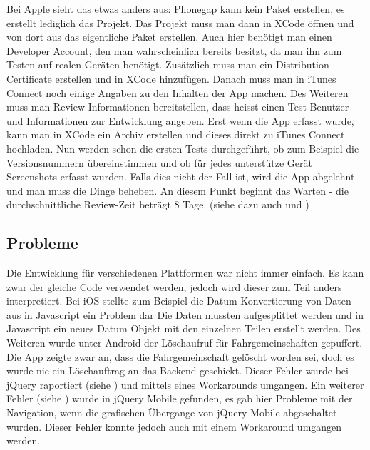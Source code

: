 Bei Apple sieht das etwas anders aus: Phonegap kann kein Paket erstellen, es erstellt lediglich das Projekt. Das Projekt muss man dann in XCode öffnen und von dort aus das eigentliche Paket erstellen. Auch hier benötigt man einen Developer Account, den man wahrscheinlich bereits besitzt, da man ihn zum Testen auf realen Geräten benötigt. Zusätzlich muss man ein Distribution Certificate erstellen und in XCode hinzufügen. Danach muss man in iTunes Connect noch einige Angaben zu den Inhalten der App machen. Des Weiteren muss man Review Informationen bereitstellen, dass heisst einen Test Benutzer und Informationen zur Entwicklung angeben. Erst wenn die App erfasst wurde, kann man in XCode ein Archiv erstellen und dieses direkt zu iTunes Connect hochladen. Nun werden schon die ersten Tests durchgeführt, ob zum Beispiel die Versionsnummern übereinstimmen und ob für jedes unterstütze Gerät Screenshots erfasst wurden. Falls dies nicht der Fall ist, wird die App abgelehnt und man muss die Dinge beheben. An diesem Punkt beginnt das Warten - die durchschnittliche Review-Zeit beträgt 8 Tage. (siehe dazu auch \cite{apple_prov_apple} und \cite{apple_prov_ralf})

\subsection{Probleme}
Die Entwicklung für verschiedenen Plattformen war nicht immer einfach. Es kann zwar der gleiche Code verwendet werden, jedoch wird dieser zum Teil anders interpretiert. Bei iOS stellte zum Beispiel die Datum Konvertierung von Daten aus  in Javascript ein Problem dar Die Daten mussten aufgesplittet werden und in Javascript ein neues Datum Objekt mit den einzelnen Teilen erstellt werden. Des Weiteren wurde unter Android der Löschaufruf für Fahrgemeinschaften gepuffert. Die App zeigte zwar an, dass die Fahrgemeinschaft gelöscht worden sei, doch es wurde nie ein Löschauftrag an das Backend geschickt. Dieser Fehler wurde bei jQuery raportiert (siehe \cite{bug_jquery}) und mittels eines Workarounds umgangen. Ein weiterer Fehler (siehe \cite{bug_jquery_mobile}) wurde in jQuery Mobile gefunden, es gab hier Probleme mit der Navigation, wenn die grafischen Übergange von jQuery Mobile abgeschaltet wurden. Dieser Fehler konnte jedoch auch mit einem Workaround umgangen werden.
